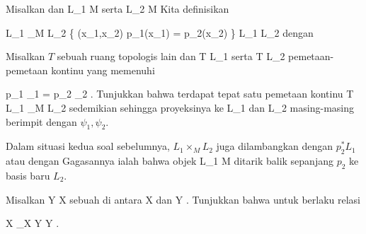 {}
{

Misalkan
dan
 {L_1 } { M
} {}
serta
 {L_2 } { M
} {}
Kita definisikan

\mavergleichskettedisp
{\vergleichskette
{L_1 \times_M L_2
}
{ } { \left\{ (x_1,x_2)  \mid   p_1(x_1) = p_2(x_2)         \right\}
}
{ \subseteq} { L_1 \times L_2
}
{ } {
}
{ } {
}
}
{}{}{}
dengan
 {Misalkan $T$ sebuah ruang topologis lain dan
 { T } { L_1
} {}
serta
 { T } { L_2
} {}
pemetaan-pemetaan kontinu yang memenuhi

\mavergleichskettedisp
{\vergleichskette
{ p_1 \circ \psi_1
}
{ =} { p_2 \circ \psi_2
}
{ } {
}
{ } {
}
{ } {}
}
{}{}{.}
Tunjukkan bahwa terdapat tepat satu pemetaan kontinu
\maabbdisp {\psi} { T } { L_1 \times_M L_2
} {}
sedemikian sehingga proyeksinya ke
\mathkor {} {L_1} {dan} {L_2} {}
masing-masing berimpit dengan $\psi_1,\psi_2$.
}

}
{} {}

Dalam situasi kedua soal sebelumnya, $L_1 \times_M L_2$
 {} {}
juga dilambangkan dengan $p_2^*L_1$ atau dengan
 Gagasannya ialah bahwa objek
 {L_1} {M
} {}
ditarik balik sepanjang $p_2$ ke basis baru $L_2$.

{}
{

Misalkan
 { Y } { X
} {}
sebuah
di antara
\mathkor {} {X} {dan} {Y} {.}
Tunjukkan bahwa untuk
berlaku relasi

\mavergleichskettedisp
{\vergleichskette
{ X \times_X Y
}
{ \cong} { Y
}
{ } {
}
{ } {
}
{ } {
}
}
{}{}{}
 {} {.}

}
{} {}

